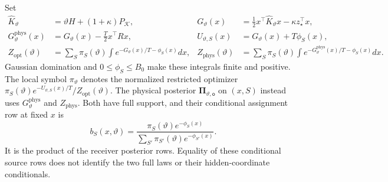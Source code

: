 Set
\begin{equation}
\begin{aligned}
\widehat K_\vartheta&=\vartheta H+(1+\kappa)P_{\mathcal K},&
G_\vartheta(x)&=\tfrac12x^\top\widehat K_\vartheta x
                  -\kappa z_\star^\top x,\\
G_\vartheta^{\mathrm{phys}}(x)
   &=G_\vartheta(x)-\tfrac T2x^\top Rx,&
U_{\vartheta,S}(x)&=G_\vartheta(x)+T\phi_S(x),\\
Z_{\mathrm{opt}}(\vartheta)
   &=\sum_S\pi_S(\vartheta)
      \int e^{-G_\vartheta(x)/T-\phi_S(x)}dx,&
Z_{\mathrm{phys}}(\vartheta)
   &=\sum_S\pi_S(\vartheta)
      \int e^{-G_\vartheta^{\mathrm{phys}}(x)/T-\phi_S(x)}dx.
\end{aligned}
\label{eq:rg-formation-partition-integrals}
\end{equation}
Gaussian domination and \(0\le\phi_S\le B_0\) make these integrals
finite and positive. The local symbol \(\pi_\vartheta\) denotes the
normalized restricted optimizer
\(\pi_S(\vartheta)e^{-U_{\vartheta,S}(x)/T}/Z_{\mathrm{opt}}(\vartheta)\).
The physical posterior \(\boldsymbol\Pi_{\vartheta,\mathsf o}\) on
\((x,S)\) instead uses \(G_\vartheta^{\mathrm{phys}}\) and
\(Z_{\mathrm{phys}}\). Both have full support, and their conditional
assignment row at fixed \(x\) is
\begin{equation}
b_S(x,\vartheta)=
\frac{\pi_S(\vartheta)e^{-\phi_S(x)}}
     {\sum_{S'}\pi_{S'}(\vartheta)e^{-\phi_{S'}(x)}}.
\label{eq:rg-formation-full-source-row}
\end{equation}
It is the product of the receiver posterior rows. Equality of these
conditional source rows does not identify the two full laws or their
hidden-coordinate conditionals. 

